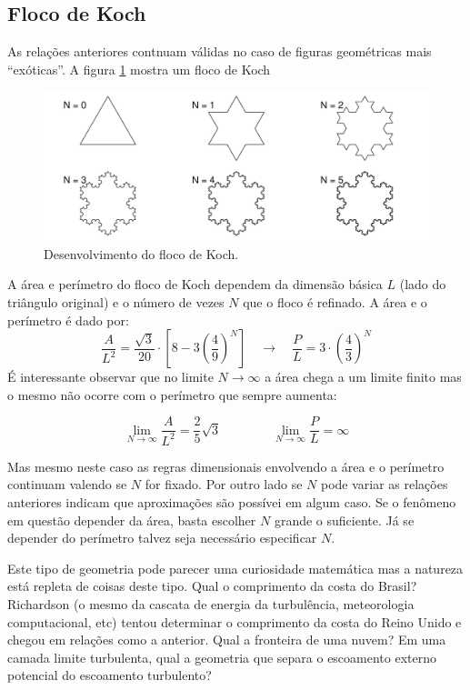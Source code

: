 \documentclass[article,12pt,oneside,a4paper,english,brazil,sumario=tradicional]{abntex2}
\newcommand{\lra}{\ensuremath{\longrightarrow}}
\newcommand{\qrq}{\ensuremath{\quad\lra\quad}}
\begin{document}
\subsection{Floco de Koch}

As relações anteriores contnuam válidas no caso de figuras geométricas mais ``exóticas''. A figura \ref{fig:koch} mostra um floco de Koch

\begin{figure}
\centering
\includegraphics[width=\textwidth]{./figuras/koch.pdf}
\caption{Desenvolvimento do floco de Koch.}
\label{fig:koch}
\end{figure}

A área e perímetro do floco de Koch dependem da dimensão básica $L$ (lado do triângulo original) e o número de vezes $N$ que o floco é refinado. A área e o perímetro é dado por:
\[
\frac{A}{L^2} = \frac{\sqrt{3}}{20} \cdot \left[8 - 3\left(\frac{4}{9}\right)^N\right] \qrq \frac{P}{L} = 3\cdot\left(\frac{4}{3}\right)^N
\]
É interessante observar que no limite $N\lra\infty$ a área chega a um limite finito mas o mesmo não ocorre com o perímetro que sempre aumenta:

\[
\lim_{N\lra\infty} \frac{A}{L^2} = \frac{2}{5}\sqrt{3} \qquad\qquad \lim_{N\lra\infty}\frac{P}{L} = \infty
\]

Mas mesmo neste caso as regras dimensionais envolvendo a área e o perímetro continuam valendo se $N$ for fixado. Por outro lado se $N$ pode variar as relações anteriores indicam que aproximações são possívei em algum caso. Se o fenômeno em questão depender da área, basta escolher $N$ grande o suficiente. Já se depender do perímetro talvez seja necessário especificar $N$.

Este tipo de geometria pode parecer uma curiosidade matemática mas a natureza está repleta de coisas deste tipo. Qual o comprimento da costa do Brasil? Richardson (o mesmo da cascata de energia da turbulência, meteorologia computacional, etc) tentou determinar o comprimento da costa do Reino Unido e chegou em relações como a anterior. Qual a fronteira de uma nuvem? Em uma camada limite turbulenta, qual a geometria que separa o escoamento externo potencial do escoamento turbulento?
\end{document}
